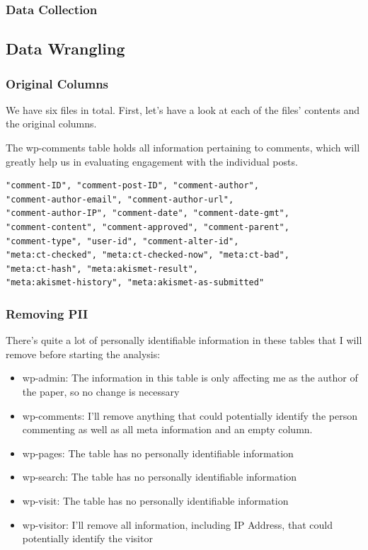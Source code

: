 \subsubsection{Data Collection}

\subsection{Data Wrangling}

\subsubsection{Original Columns}

We have six files in total. First, let's have a look at each of the files' contents and the original columns.

The wp-comments table holds all information pertaining to comments, which will greatly help us in evaluating engagement with the individual posts.
\begin{lstlisting}[caption=wp-comments, frame=single, basicstyle=\ttfamily]
"comment-ID", "comment-post-ID", "comment-author", 
"comment-author-email", "comment-author-url", 
"comment-author-IP", "comment-date", "comment-date-gmt", 
"comment-content", "comment-approved", "comment-parent", 
"comment-type", "user-id", "comment-alter-id", 
"meta:ct-checked", "meta:ct-checked-now", "meta:ct-bad", 
"meta:ct-hash", "meta:akismet-result", 
"meta:akismet-history", "meta:akismet-as-submitted"
\end{lstlisting}

\subsubsection{Removing PII}

There's quite a lot of personally identifiable information in these tables that I will remove before starting the analysis:

\begin{itemize}
 \item wp-admin: The information in this table is only affecting me as the author of the paper, so no change is necessary
 \item wp-comments: I'll remove anything that could potentially identify the person commenting as well as all meta information and an empty column.
 \item wp-pages: The table has no personally identifiable information
 \item wp-search: The table has no personally identifiable information
 \item wp-visit: The table has no personally identifiable information
 \item wp-visitor: I'll remove all information, including IP Address, that could potentially identify the visitor
\end{itemize}

